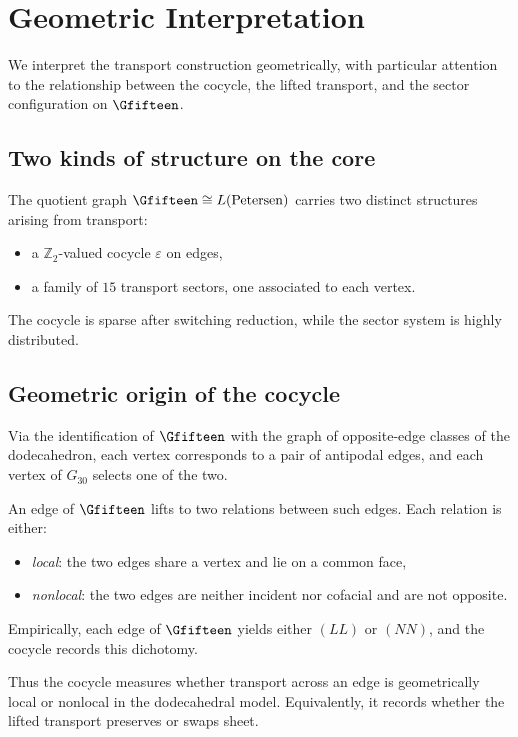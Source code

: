 \section{Geometric Interpretation}

We interpret the transport construction geometrically, with particular
attention to the relationship between the cocycle, the lifted transport,
and the sector configuration on $\Gfifteen$.

\subsection{Two kinds of structure on the core}

The quotient graph $\Gfifteen \cong L(\mathrm{Petersen})$ carries two
distinct structures arising from transport:
\begin{itemize}
\item a $\mathbb{Z}_2$-valued cocycle $\varepsilon$ on edges,
\item a family of $15$ transport sectors, one associated to each vertex.
\end{itemize}

The cocycle is sparse after switching reduction, while the sector system
is highly distributed.

\subsection{Geometric origin of the cocycle}

Via the identification of $\Gfifteen$ with the graph of opposite-edge
classes of the dodecahedron, each vertex corresponds to a pair of
antipodal edges, and each vertex of $G_{30}$ selects one of the two.

An edge of $\Gfifteen$ lifts to two relations between such edges. Each
relation is either:
\begin{itemize}
\item \emph{local}: the two edges share a vertex and lie on a common face,
\item \emph{nonlocal}: the two edges are neither incident nor cofacial and
are not opposite.
\end{itemize}

Empirically, each edge of $\Gfifteen$ yields either $(LL)$ or $(NN)$, and
the cocycle records this dichotomy.

Thus the cocycle measures whether transport across an edge is
geometrically local or nonlocal in the dodecahedral model. Equivalently,
it records whether the lifted transport preserves or swaps sheet.

